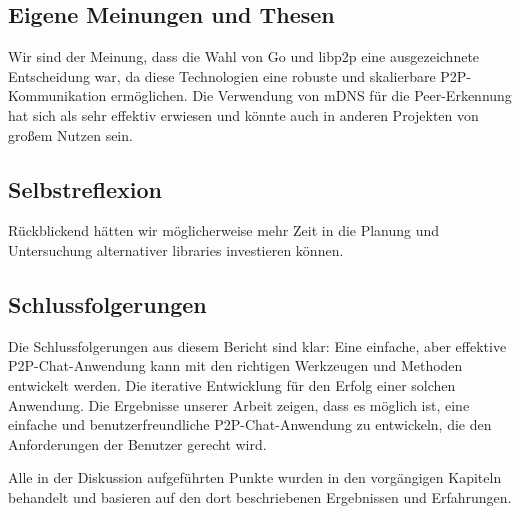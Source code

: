 \subsection{Eigene Meinungen und Thesen}

Wir sind der Meinung, dass die Wahl von Go und libp2p eine ausgezeichnete Entscheidung war, da diese Technologien eine robuste und skalierbare P2P-Kommunikation ermöglichen. Die Verwendung von mDNS für die Peer-Erkennung hat sich als sehr effektiv erwiesen und könnte auch in anderen Projekten von großem Nutzen sein.

\subsection{Selbstreflexion}

Rückblickend hätten wir möglicherweise mehr Zeit in die Planung und Untersuchung alternativer libraries investieren können.

\subsection{Schlussfolgerungen}

Die Schlussfolgerungen aus diesem Bericht sind klar: Eine einfache, aber effektive P2P-Chat-Anwendung kann mit den richtigen Werkzeugen und Methoden entwickelt werden. Die iterative Entwicklung für den Erfolg einer solchen Anwendung. Die Ergebnisse unserer Arbeit zeigen, dass es möglich ist, eine einfache und benutzerfreundliche P2P-Chat-Anwendung zu entwickeln, die den Anforderungen der Benutzer gerecht wird.

Alle in der Diskussion aufgeführten Punkte wurden in den vorgängigen Kapiteln behandelt und basieren auf den dort beschriebenen Ergebnissen und Erfahrungen.
\newpage
